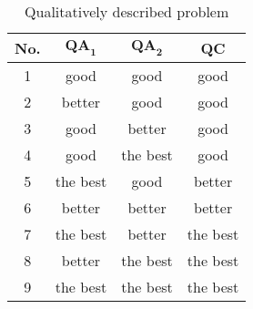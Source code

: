 \begin{table}[!ht]
\centering
\caption{Qualitatively described problem}
\begin{tabular}{cccc}
\toprule 
\textbf{No.} & ${{\mathbf {QA}}}_{{\mathbf 1}}$\textbf{} & ${{\mathbf {QA}}}_{{\mathbf 2}}$\textbf{} & 		\textbf{QC} \\
\midrule
1 & good & good  & good \\ 
2 & better & good & good \\ 
3 & good & better & good \\ 
4 & good & the best & good \\ 
\rowcolor[gray]{0.9} 5 & the best & good & better\\ 
\rowcolor[gray]{0.9} 6 & better & better & better \\ 
7 & the best & better & the best \\ 
8 & better & the best & the best \\ 
9 & the best & the best & the best \\ 
\bottomrule 
\end{tabular}
\label{tbl:QQqual}
\hspace{0.5cm}
\end{table}


%
%
%

